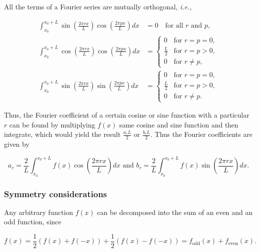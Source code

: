 \documentclass[english,a4paper,12pt]{report}
\begin{document}
All the terms of a Fourier series are mutually orthogonal, \textit{i.e.,} 

\begin{equation}
    \begin{aligned}
        \int_{x_0}^{x_0+L} \sin\left(\frac{2\pi r x}{L}\right) \cos\left(\frac{2\pi p x}{L}\right) dx &= 0 \quad \text{for all } r \text{ and } p, \\
        \int_{x_0}^{x_0+L} \cos\left(\frac{2\pi r x}{L}\right) \cos\left(\frac{2\pi p x}{L}\right) dx &=
\begin{cases} 
    0 & \text{for } r = p = 0, \\
    \frac{L}{2} & \text{for } r = p > 0, \\
    0 & \text{for } r \neq p,
\end{cases} \\
\int_{x_0}^{x_0+L} \sin\left(\frac{2\pi r x}{L}\right) \sin\left(\frac{2\pi p x}{L}\right) dx &=
\begin{cases} 
    0 & \text{for } r = p = 0, \\
    \frac{L}{2} & \text{for } r = p > 0, \\
    0 & \text{for } r \neq p.
\end{cases}
    \end{aligned}
\end{equation}

Thus, the Fourier coefficient of a certain cosine or sine function with a particular \(r\) can be found by multiplying \(f(x)\) same cosine and sine function and then integrate, which would yield the result \(\frac{a_{r} L}{2} \text { or } \frac{b_{r}L }{2} \). Thus the Fourier coefficients are given by 

\begin{equation}
    a_{r} = \frac{2}{L} \int_{x_0}^{x_0 + L} f(x) \cos \left( \frac{2\pi rx}{L}  \right) dx \text { and } b_{r} = \frac{2}{L} \int_{x_0 }^{x_0 + L} f(x) \sin \left( \frac{2\pi rx}{L}  \right) dx.   
\end{equation}

\subsubsection{Symmetry considerations}

Any arbitrary function \(f(x)\) can be decomposed into the sum of an even and an odd function, since

\begin{equation}
    f(x) = \frac{1}{2}(f(x) + f(-x)) + \frac{1}{2} (f(x) - f(-x)) = f_{\text{odd} }(x) + f_{\text{even} }(x).
\end{equation}
\end{document}
